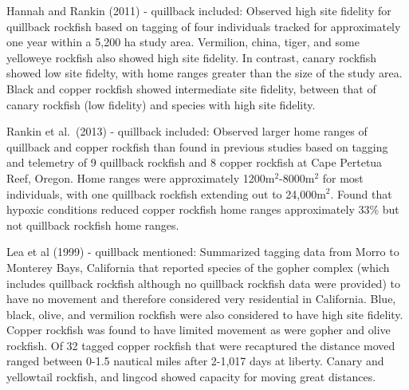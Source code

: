 \documentclass[11pt,
  english,
  letterpaper,
]{article}
\begin{document}
\leavevmode\tagmcend\tagstructend\par


Hannah and Rankin {(2011)\leavevmode\tagmcend\tagstructend} - quillback included: Observed high site fidelity for quillback rockfish based on tagging of four individuals tracked for approximately one year within a 5,200 ha study area. Vermilion, china, tiger, and some yelloweye rockfish also showed high site fidelity. In contrast, canary rockfish showed low site fidelty, with home ranges greater than the size of the study area. Black and copper rockfish showed intermediate site fidelity, between that of canary rockfish (low fidelity) and species with high site fidelity.

\leavevmode\tagmcend\tagstructend\par


Rankin et al.~{(2013)\leavevmode\tagmcend\tagstructend} - quillback included: Observed larger home ranges of quillback and copper rockfish than found in previous studies based on tagging and telemetry of 9 quillback rockfish and 8 copper rockfish at Cape Pertetua Reef, Oregon. Home ranges were approximately 1200m{\(^2\)\leavevmode\tagmcend\tagstructend}-8000m{\(^2\)\leavevmode\tagmcend\tagstructend} for most individuals, with one quillback rockfish extending out to 24,000m{\(^2\)\leavevmode\tagmcend\tagstructend}. Found that hypoxic conditions reduced copper rockfish home ranges approximately 33\% but not quillback rockfish home ranges.

\leavevmode\tagmcend\tagstructend\par


Lea et al {(1999)\leavevmode\tagmcend\tagstructend} - quillback mentioned: Summarized tagging data from Morro to Monterey Bays, California that reported species of the gopher complex (which includes quillback rockfish although no quillback rockfish data were provided) to have no movement and therefore considered very residential in California. Blue, black, olive, and vermilion rockfish were also considered to have high site fidelity. Copper rockfish was found to have limited movement as were gopher and olive rockfish. Of 32 tagged copper rockfish that were recaptured the distance moved ranged between 0-1.5 nautical miles after 2-1,017 days at liberty. Canary and yellowtail rockfish, and lingcod showed capacity for moving great distances.
\end{document}
